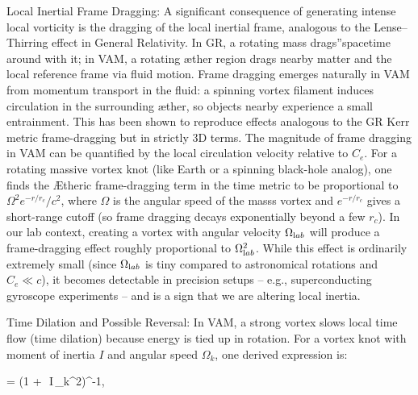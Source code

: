 Local Inertial Frame Dragging: A significant consequence of generating intense local vorticity is the dragging of the local inertial frame, analogous to the Lense–Thirring effect in General Relativity. In GR, a rotating mass \grqq drags\textquotedblright spacetime around with it; in VAM, a rotating æther region drags nearby matter and the local reference frame via fluid motion. Frame dragging emerges naturally in VAM from momentum transport in the fluid: a spinning vortex filament induces circulation in the surrounding æther, so objects nearby experience a small entrainment. This has been shown to reproduce effects analogous to the GR Kerr metric frame-dragging but in strictly 3D terms. The magnitude of frame dragging in VAM can be quantified by the local circulation velocity relative to $C_e$. For a rotating massive vortex knot (like Earth or a spinning black-hole analog), one finds the Ætheric frame-dragging term in the time metric to be proportional to $\Omega^2 e^{-r/r_c}/c^2$, where $\Omega$ is the angular speed of the mass\rqs s vortex and $e^{-r/r_c}$ gives a short-range cutoff (so frame dragging decays exponentially beyond a few $r_c$). In our lab context, creating a vortex with angular velocity $\Omega_{\textrm lab}$ will produce a frame-dragging effect roughly proportional to $\Omega_{\textrm lab}^2$. While this effect is ordinarily extremely small (since $\Omega_{\textrm lab}$ is tiny compared to astronomical rotations and $C_e \ll c$), it becomes detectable in precision setups – e.g., superconducting gyroscope experiments – and is a sign that we are altering local inertia.


Time Dilation and Possible Reversal: In VAM, a strong vortex slows local time flow (time dilation) because energy is tied up in rotation. For a vortex knot with moment of inertia $I$ and angular speed $\Omega_k$, one derived expression is:


 \;=\; \Big(1 + \,\beta\,I\,\Omega_k^2\Big)^{-1}, \label{eq:timedil}


